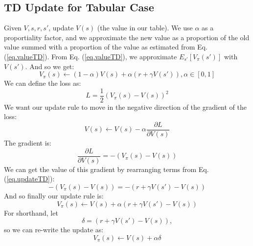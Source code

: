 \documentclass[11pt]{article}
\numberwithin{equation}{section}
\numberwithin{figure}{section}
\begin{document}
\subsection*{TD Update for Tabular Case}
Given $V, s, r, s'$, update $V(s)$ (the value in our table).  We use $\alpha$ as a proportiality factor, and we approximate the new value as a proportion of the old value summed with a proportion of the value as estimated from Eq. (\ref{eq.valueTD}).  From Eq. (\ref{eq.valueTD}), we approximate $E_{s'}[V_\pi(s')]$ with $V(s')$.  And so we get:
\begin{equation}
	V_\pi(s) \leftarrow (1-\alpha)V(s) + \alpha(r+\gamma V(s')), \alpha \in [0,1]
	\label{eq.updateTD}
\end{equation}
We can define the loss as:
\begin{equation}
	L = \frac{1}{2}(V_\pi(s)-V(s))^2
\end{equation}
We want our update rule to move in the negative direction of the gradient of the loss:
\begin{equation}
	V(s) \leftarrow V(s) - \alpha \frac{\partial L}{\partial V(s)}
\end{equation}
The gradient is:
\begin{equation}
	\frac{\partial L}{\partial V(s)} = -(V_\pi(s) - V(s))
	\label{eq.gradientLoss}
\end{equation}
We can get the value of this gradient by rearranging terms from Eq. (\ref{eq.updateTD}):
\begin{equation}
	-(V_\pi(s) - V(s)) = -(r + \gamma V(s') - V(s))
\end{equation}
And so finally our update rule is:
\begin{equation}
	V_\pi(s) \leftarrow V(s) + \alpha (r + \gamma V(s') - V(s))
	\label{eq.updateTDFinal}
\end{equation}
For shorthand, let 
\begin{equation}
	\delta = (r + \gamma V(s') - V(s)),
	\label{eq.delta}
\end{equation}
so we can re-write the update as:
\begin{equation}
	V_\pi(s) \leftarrow V(s) + \alpha \delta
	\label{eq.updateTDShort}
\end{equation}
\end{document}
